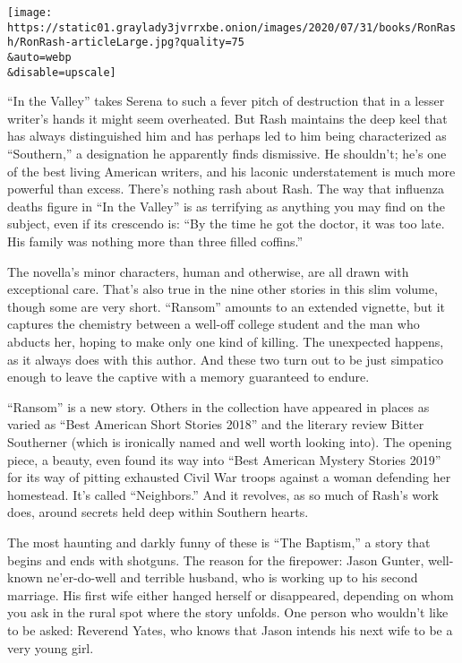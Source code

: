 \texttt{[image: https://static01.graylady3jvrrxbe.onion/images/2020/07/31/books/RonRash/RonRash-articleLarge.jpg?quality=75\\\&auto=webp\\\&disable=upscale]}

``In the Valley'' takes Serena to such a fever pitch of destruction that
in a lesser writer's hands it might seem overheated. But Rash maintains
the deep keel that has always distinguished him and has perhaps led to
him being characterized as ``Southern,'' a designation he apparently
finds dismissive. He shouldn't; he's one of the best living American
writers, and his laconic understatement is much more powerful than
excess. There's nothing rash about Rash. The way that influenza deaths
figure in ``In the Valley'' is as terrifying as anything you may find on
the subject, even if its crescendo is: ``By the time he got the doctor,
it was too late. His family was nothing more than three filled
coffins.''

The novella's minor characters, human and otherwise, are all drawn with
exceptional care. That's also true in the nine other stories in this
slim volume, though some are very short. ``Ransom'' amounts to an
extended vignette, but it captures the chemistry between a well-off
college student and the man who abducts her, hoping to make only one
kind of killing. The unexpected happens, as it always does with this
author. And these two turn out to be just simpatico enough to leave the
captive with a memory guaranteed to endure.

``Ransom'' is a new story. Others in the collection have appeared in
places as varied as ``Best American Short Stories 2018'' and the
literary review Bitter Southerner (which is ironically named and well
worth looking into). The opening piece, a beauty, even found its way
into ``Best American Mystery Stories 2019'' for its way of pitting
exhausted Civil War troops against a woman defending her homestead. It's
called ``Neighbors.'' And it revolves, as so much of Rash's work does,
around secrets held deep within Southern hearts.

The most haunting and darkly funny of these is ``The Baptism,'' a story
that begins and ends with shotguns. The reason for the firepower: Jason
Gunter, well-known ne'er-do-well and terrible husband, who is working up
to his second marriage. His first wife either hanged herself or
disappeared, depending on whom you ask in the rural spot where the story
unfolds. One person who wouldn't like to be asked: Reverend Yates, who
knows that Jason intends his next wife to be a very young girl.


